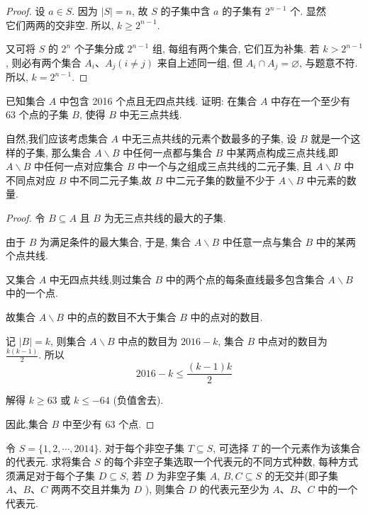 \begin{proof}
	设 $a \in S$. 因为 $|S|=n$, 故 $S$ 的子集中含 $a$ 的子集有 $2^{n-1}$ 个. 显然\\
	它们两两的交非空. 所以, $k \geqslant 2^{n-1}$.

	又可将 $S$ 的 $2^{n}$ 个子集分成 $2^{n-1}$ 组, 每组有两个集合, 它们互为补集. 若 $k>2^{n-1}$, 则必有两个集合 $A_{i} 、 A_{j}(i \neq j)$ 来自上述同一组, 但 $A_{i} \cap A_{j}=\varnothing$, 与题意不符. 所以, $k=2^{n-1}$.
\end{proof}

\begin{example}
	已知集合 $A$ 中包含 2016 个点且无四点共线. 证明: 在集合 $A$ 中存在一个至少有 63 个点的子集 $B$, 使得 $B$ 中无三点共线.
\end{example}

\begin{analysis}
	自然,我们应该考虑集合 $A$ 中无三点共线的元素个数最多的子集, 设 $B$ 就是一个这样的子集, 那么集合 $A \backslash B$ 中任何一点都与集合 $B$ 中某两点构成三点共线,即 $A \backslash B$ 中任何一点对应集合 $B$ 中一个与之组成三点共线的二元子集, 且 $A \backslash B$ 中不同点对应 $B$ 中不同二元子集,故 $B$ 中二元子集的数量不少于 $A \backslash B$ 中元素的数量.
\end{analysis}

\begin{proof}
	令 $B \subseteq A$ 且 $B$ 为无三点共线的最大的子集.

	由于 $B$ 为满足条件的最大集合, 于是, 集合 $A \backslash B$ 中任意一点与集合 $B$ 中的某两个点共线.

	又集合 $A$ 中无四点共线,则过集合 $B$ 中的两个点的每条直线最多包含集合 $A \backslash B$ 中的一个点.

	故集合 $A \backslash B$ 中的点的数目不大于集合 $B$ 中的点对的数目.

	记 $|B|=k$, 则集合 $A \backslash B$ 中点的数目为 $2016-k$, 集合 $B$ 中点对的数目为 $\frac{k(k-1)}{2}$. 所以
	$$
		2016-k \leqslant \frac{(k-1) k}{2}
	$$

	解得 $k \geqslant 63$ 或 $k \leqslant-64$ (负值舍去).

	因此,集合 $B$ 中至少有 63 个点.
\end{proof}

\begin{example}
	令 $S=\{1,2, \cdots, 2014\}$. 对于每个非空子集 $T \subseteq S$, 可选择 $T$ 的一个元素作为该集合的代表元. 求将集合 $S$ 的每个非空子集选取一个代表元的不同方式种数, 每种方式须满足对于每个子集 $D \subseteq S$, 若 $D$ 为非空子集 $A$, $B, C \subseteq S$ 的无交并(即子集 $A 、 B 、 C$ 两两不交且并集为 $D$ ), 则集合 $D$ 的代表元至少为 $A 、 B 、 C$ 中的一个代表元.
\end{example}

